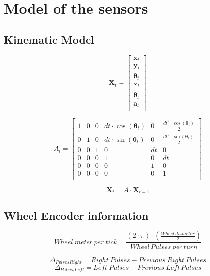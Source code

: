 
\appendix
\renewcommand{\chaptermark}[1]{\markboth{Appendix \thechapter\relax:\thinspace\relax#1}{}}

\chapter{Model of the sensors}


\section{Kinematic Model}
\noindent
$$
  \label{eq:state}
\mathbf{X}_t=
\begin{bmatrix} 
\mathbf{x}_t \\ \mathbf{y}_t \\ \boldsymbol \theta_t \\ \mathbf{v}_t \\ \dot{\boldsymbol \theta}_t \\ \mathbf{a}_t \\[0.3em]
\end{bmatrix}
$$

\begin{equation}
A_t
=
\begin{bmatrix} 
1 & 0 & 0 & dt \cdot \cos(\boldsymbol \theta_t) & 0 & \frac{dt^2 \cdot \cos(\boldsymbol \theta_t)}{2} \\ 
0 & 1 & 0 & dt \cdot \sin(\boldsymbol \theta_t)& 0 & \frac{dt^2 \cdot \sin(\boldsymbol \theta_t)}{2} \\ 
0 & 0 & 1 & 0 & dt & 0 \\ 
0 & 0 & 0 & 1 & 0 & dt \\ 
0 & 0 & 0 & 0 & 1 & 0 \\ 
0 & 0 & 0 & 0 & 0 & 1 \\[0.3em]
\end{bmatrix}
\end{equation}

\begin{equation}
    \mathbf{X}_t = A \cdot \mathbf{X}_{t-1}
\end{equation}

\section{Wheel Encoder information}

$$
Wheel~meter~per~tick = \frac{( 2 \cdot \pi ) \cdot ( \frac{Wheel~diameter}{2}) }{Wheel~Pulses~per~turn}
$$


$$
\Delta _{PulsesRight} = Right~Pulses - Previous~Right~Pulses
$$
$$
\Delta _{PulsesLeft}  = Left~Pulses  - Previous~Left~Pulses
$$


